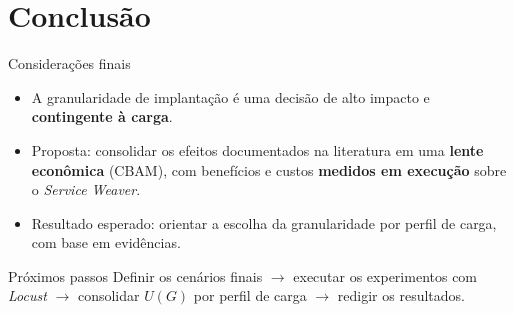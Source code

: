 

\section{Conclusão}
\label{sec:conclusao}

\begin{frame}{Considerações finais}
    \begin{itemize}
        \item A granularidade de implantação é uma decisão de alto impacto e \textbf{contingente à carga}.
        \item Proposta: consolidar os efeitos documentados na literatura em uma \textbf{lente econômica} (CBAM), com benefícios e custos \textbf{medidos em execução} sobre o \textit{Service Weaver}.
        \item Resultado esperado: orientar a escolha da granularidade por perfil de carga, com base em evidências.
    \end{itemize}
    \vfill
    \begin{block}{Próximos passos}
        \small Definir os cenários finais $\rightarrow$ executar os experimentos com \textit{Locust} $\rightarrow$ consolidar $U(G)$ por perfil de carga $\rightarrow$ redigir os resultados.
    \end{block}
\end{frame}
